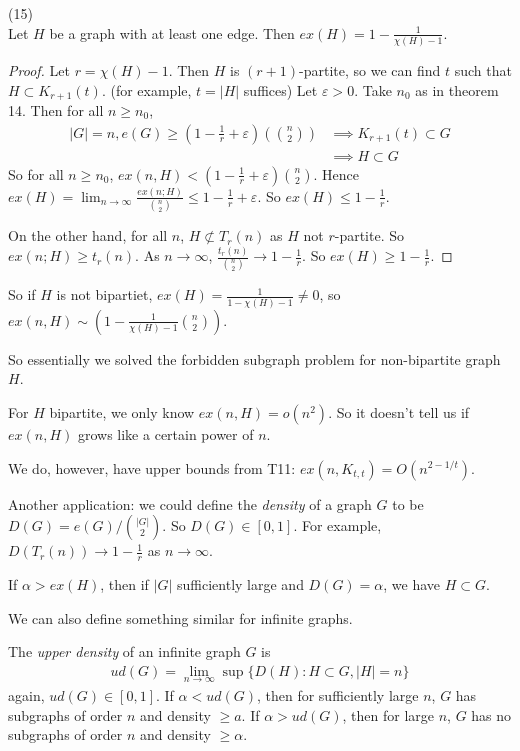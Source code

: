 \documentclass[a4paper]{article}
\begin{document}
\begin{coro} (15)\\
Let $H$ be a graph with at least one edge. Then $ex(H) = 1-\frac{1}{\chi(H) - 1}$.
\begin{proof}
Let $r = \chi(H) - 1$. Then $H$ is $(r+1)$-partite, so we can find $t$ such that $H \subset K_{r+1}(t)$. (for example, $t=|H|$ suffices) Let $\varepsilon>0$. Take $n_0$ as in theorem 14. Then for all $n \geq n_0$,
\begin{equation*}
\begin{aligned}
|G| = n, e(G) \geq (1-\frac{1}{r}+\varepsilon) ({n \choose 2}) &\implies K_{r+1} (t) \subset G\\
&\implies H \subset G
\end{aligned}
\end{equation*}
So for all $n \geq n_0$, $ex(n,H) < (1-\frac{1}{r} + \varepsilon) {n \choose 2}$. Hence $ex(H) = \lim_{n \to \infty} \frac{ex(n;H)}{{n \choose 2}} \leq 1 - \frac{1}{r} + \varepsilon$. So $ex(H) \leq 1-\frac{1}{r}$.

On the other hand, for all $n$, $H \not\subset T_r(n)$ as $H$ not $r$-partite. So $ex(n;H) \geq t_r(n)$. As $n \to \infty$, $\frac{t_r(n)}{{n \choose 2}} \to 1-\frac{1}{r}$. So $ex(H) \geq 1-\frac{1}{r}$.
\end{proof}
\end{coro}

So if $H$ is not bipartiet, $ex(H) = \frac{1}{1-\chi(H) - 1} \neq 0$, so $ex(n,H) \sim (1-\frac{1}{\chi(H)-1} {n \choose 2})$.

So essentially we solved the forbidden subgraph problem for non-bipartite graph $H$.

For $H$ bipartite, we only know $ex(n,H) = o(n^2)$. So it doesn't tell us if $ex(n,H)$ grows like a certain power of $n$.

We do, however, have upper bounds from T11: $ex(n,K_{t,t}) = O(n^{2-1/t})$.

Another application: we could define the \emph{density} of a graph $G$ to be $D(G) = e(G) / {|G| \choose 2}$. So $D(G) \in [0,1]$. For example, $D(T_r(n)) \to 1-\frac{1}{r}$ as $n \to \infty$.

If $\alpha > ex(H)$, then if $|G|$ sufficiently large and $D(G) = \alpha$, we have $H \subset G$.

We can also define something similar for infinite graphs.

\begin{defi} 
The \emph{upper density} of an infinite graph $G$ is
\begin{equation*}
\begin{aligned}
ud(G) = \lim_{n \to \infty} \sup\{D(H) : H \subset G, |H| = n\}
\end{aligned}
\end{equation*}
again, $ud(G) \in [0,1]$. If $\alpha < ud(G)$, then for sufficiently large $n$, $G$ has subgraphs of order $n$ and density $\geq a$. If $\alpha>ud(G)$, then for large $n$, $G$ has no subgraphs of order $n$ and density $\geq \alpha$.
\end{defi}
\end{document}

